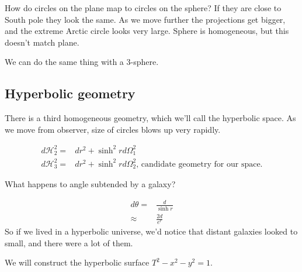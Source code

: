 \documentclass[]{article}
\begin{document}
How do circles on the plane map to circles on the sphere? If they are close to South pole they look the same. As we move further the projections get bigger, and the extreme Arctic circle looks very large. Sphere is homogeneous, but this doesn't match plane. 

We can do the same thing with a 3-sphere.

\subsection{Hyperbolic geometry}\label{sec:negative:curvature}
There is a third homogeneous geometry, which we'll call the hyperbolic space. As we move from observer, size of circles blows up very rapidly.

\begin{align*}
	d\mathcal{H}_2^2 =& dr^2 + \sinh^2 r d\Omega_1^2\\
	d\mathcal{H}_3^2 =& dr^2 + \sinh^2 r d\Omega_2^2 \text{, candidate geometry for our space.}
\end{align*}

What happens to angle subtended by a galaxy?

\begin{align*}
	d\theta	 =& \frac{d}{\sinh r}\\
	\approx& \frac{2d}{e^r}
\end{align*}
So if we lived in a hyperbolic universe, we'd notice that distant galaxies looked to small, and there were a lot of them.

We will construct the hyperbolic surface $T^2-x^2-y^2=1$.
\end{document}
